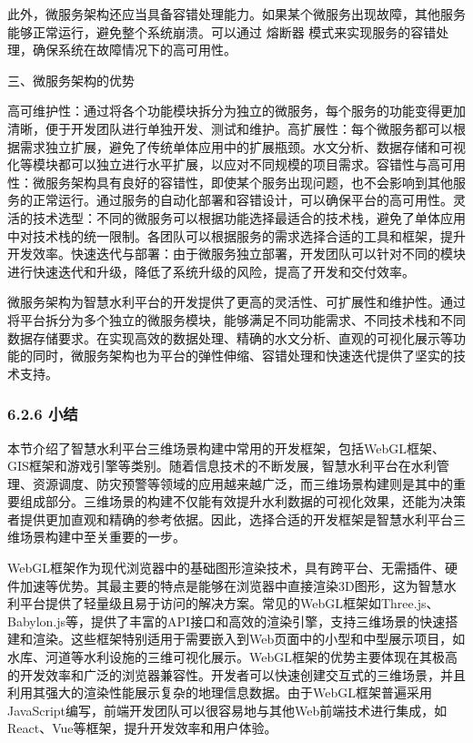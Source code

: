 此外，微服务架构还应当具备容错处理能力。如果某个微服务出现故障，其他服务能够正常运行，避免整个系统崩溃。可以通过 熔断器 模式来实现服务的容错处理，确保系统在故障情况下的高可用性。

三、微服务架构的优势

高可维护性：通过将各个功能模块拆分为独立的微服务，每个服务的功能变得更加清晰，便于开发团队进行单独开发、测试和维护。高扩展性：每个微服务都可以根据需求独立扩展，避免了传统单体应用中的扩展瓶颈。水文分析、数据存储和可视化等模块都可以独立进行水平扩展，以应对不同规模的项目需求。容错性与高可用性：微服务架构具有良好的容错性，即使某个服务出现问题，也不会影响到其他服务的正常运行。通过服务的自动化部署和容错设计，可以确保平台的高可用性。灵活的技术选型：不同的微服务可以根据功能选择最适合的技术栈，避免了单体应用中对技术栈的统一限制。各团队可以根据服务的需求选择合适的工具和框架，提升开发效率。快速迭代与部署：由于微服务独立部署，开发团队可以针对不同的模块进行快速迭代和升级，降低了系统升级的风险，提高了开发和交付效率。

微服务架构为智慧水利平台的开发提供了更高的灵活性、可扩展性和维护性。通过将平台拆分为多个独立的微服务模块，能够满足不同功能需求、不同技术栈和不同数据存储要求。在实现高效的数据处理、精确的水文分析、直观的可视化展示等功能的同时，微服务架构也为平台的弹性伸缩、容错处理和快速迭代提供了坚实的技术支持。

\subsubsection{6.2.6 小结}\label{ux5c0fux7ed3-1}

本节介绍了智慧水利平台三维场景构建中常用的开发框架，包括WebGL框架、GIS框架和游戏引擎等类别。随着信息技术的不断发展，智慧水利平台在水利管理、资源调度、防灾预警等领域的应用越来越广泛，而三维场景构建则是其中的重要组成部分。三维场景的构建不仅能有效提升水利数据的可视化效果，还能为决策者提供更加直观和精确的参考依据。因此，选择合适的开发框架是智慧水利平台三维场景构建中至关重要的一步。

WebGL框架作为现代浏览器中的基础图形渲染技术，具有跨平台、无需插件、硬件加速等优势。其最主要的特点是能够在浏览器中直接渲染3D图形，这为智慧水利平台提供了轻量级且易于访问的解决方案。常见的WebGL框架如Three.js、Babylon.js等，提供了丰富的API接口和高效的渲染引擎，支持三维场景的快速搭建和渲染。这些框架特别适用于需要嵌入到Web页面中的小型和中型展示项目，如水库、河道等水利设施的三维可视化展示。WebGL框架的优势主要体现在其极高的开发效率和广泛的浏览器兼容性。开发者可以快速创建交互式的三维场景，并且利用其强大的渲染性能展示复杂的地理信息数据。由于WebGL框架普遍采用JavaScript编写，前端开发团队可以很容易地与其他Web前端技术进行集成，如React、Vue等框架，提升开发效率和用户体验。

